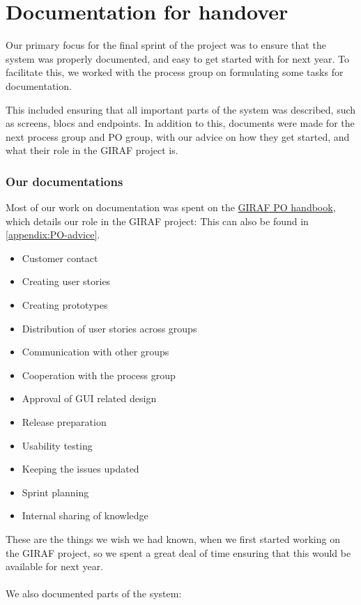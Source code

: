 \section{Documentation for handover}
Our primary focus for the final sprint of the project was to ensure that the system was properly documented, and easy to get started with for next year.
To facilitate this, we worked with the process group on formulating some tasks for documentation.

This included ensuring that all important parts of the system was described, such as screens, blocs and endpoints.
In addition to this, documents were made for the next process group and PO group, with our advice on how they get started, and what their role in the GIRAF project is.

\subsubsection{Our documentations}
Most of our work on documentation was spent on the \href{https://github.com/aau-giraf/wiki/blob/master/advice_for_future_giraf/PO_advice.md}{GIRAF PO handbook}, which details our role in the GIRAF project:
This can also be found in \autoref{appendix:PO-advice}.

\begin{itemize}
    \item Customer contact
    \item Creating user stories 
    \item Creating prototypes
    \item Distribution of user stories across groups
    \item Communication with other groups
    \item Cooperation with the process group
    \item Approval of GUI related design
    \item Release preparation
    \item Usability testing
    \item Keeping the issues updated
    \item Sprint planning
    \item Internal sharing of knowledge
\end{itemize}

These are the things we wish we had known, when we first started working on the GIRAF project, so we spent a great deal of time ensuring that this would be available for next year.
\\\\
We also documented parts of the system:

